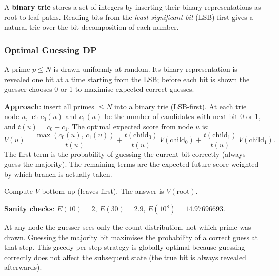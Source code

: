 A \textbf{binary trie} stores a set of integers by inserting their binary representations as root-to-leaf paths. Reading bits from the \emph{least significant bit} (LSB) first gives a natural trie over the bit-decomposition of each number.

\subsubsection*{Optimal Guessing DP}

\begin{example}
A prime $p \le N$ is drawn uniformly at random. Its binary representation is revealed one bit at a time starting from the LSB; before each bit is shown the guesser chooses 0 or 1 to maximise expected correct guesses.

\textbf{Approach}: insert all primes $\le N$ into a binary trie (LSB-first). At each trie node $u$, let $c_0(u)$ and $c_1(u)$ be the number of candidates with next bit 0 or 1, and $t(u) = c_0 + c_1$. The optimal expected score from node $u$ is:
\[
V(u) = \frac{\max(c_0(u),\, c_1(u))}{t(u)}
+ \frac{t(\text{child}_0)}{t(u)}\,V(\text{child}_0)
+ \frac{t(\text{child}_1)}{t(u)}\,V(\text{child}_1).
\]
The first term is the probability of guessing the current bit correctly (always guess the majority). The remaining terms are the expected future score weighted by which branch is actually taken.

Compute $V$ bottom-up (leaves first). The answer is $V(\text{root})$.

\textbf{Sanity checks}: $E(10) = 2$, $E(30) = 2.9$, $E(10^8) = 14.97696693$.
\end{example}

\begin{remark}
At any node the guesser sees only the count distribution, not which prime was drawn. Guessing the majority bit maximises the probability of a correct guess at that step. This greedy-per-step strategy is globally optimal because guessing correctly does not affect the subsequent state (the true bit is always revealed afterwards).
\end{remark}
